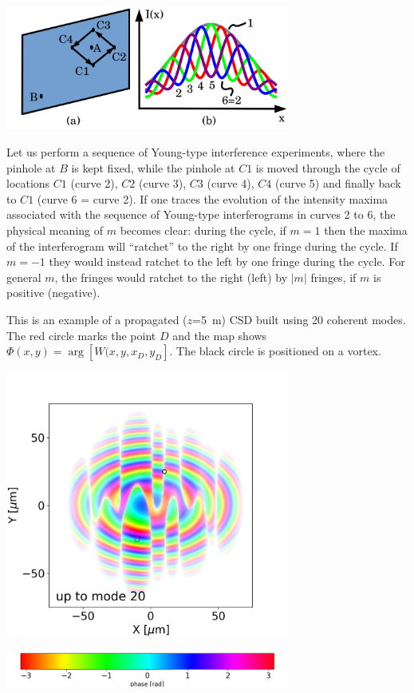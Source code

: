 \documentclass[a4paper,10pt]{article}
\begin{document}
\includegraphics[width=0.7\textwidth]{Figures/Anholonomy.png}

 
Let us perform a sequence of Young-type interference experiments, where the pinhole at $B$ is kept fixed, while the pinhole at $C1$ is moved through the cycle of locations $C1$ (curve 2), $C2$ (curve 3), $C3$ (curve 4), $C4$ (curve 5) and finally back to $C1$ (curve 6 = curve 2). If one traces the evolution of the intensity maxima associated with the sequence of Young-type interferograms in curves 2 to 6, the physical meaning of $m$ becomes clear: during the cycle, if $m=1$ then the maxima of the interferogram will ``ratchet'' to the right by one fringe during the cycle. If $m=-1$ they would instead ratchet to the left by one fringe during the cycle.  For general $m$, the fringes would ratchet to the right (left) by $|m|$ fringes, if $m$ is positive (negative).

This is an example of a propagated ($z$=5~m) CSD built using 20 coherent modes. The red circle marks the point $D$ and the map shows $\mathcal{\Phi}(x,y)=\arg[W(x,y,x_D,y_D]$. The black circle is positioned on a vortex. 
 

\includegraphics[width=0.7\textwidth]{FiguresPoster/interference_D_uptomode0020_csd.png}


\includegraphics[width=0.7\textwidth]{Figures/colorbar.png}
\end{document}
